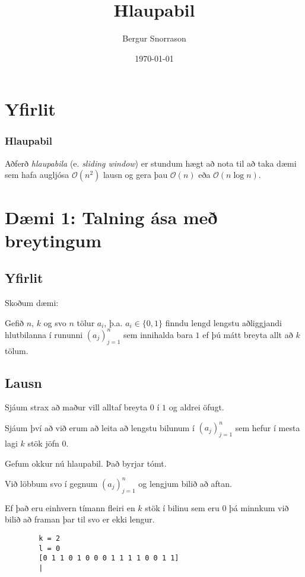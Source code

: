 \title{Hlaupabil}
\author{Bergur Snorrason}
\date{\today}



\frame{\titlepage}

\section{Yfirlit}
{
    \frametitle{Hlaupabil}
    {
        \item<1-> Aðferð \emph{hlaupabila} (e. \emph{sliding window}) er stundum hægt að nota til að taka
                    dæmi sem hafa augljósa $\mathcal{O}(n^2)$ lausn og gera þau $\mathcal{O}(n)$ eða $\mathcal{O}(n\log n)$.
    }
}

\section{Dæmi 1: Talning ása með breytingum}
\subsection{Yfirlit}
{
    {
        \item<1-> Skoðum dæmi:
        \item<2-> Gefið $n$, $k$ og svo $n$ tölur $a_i$, þ.a. $a_i \in \{0, 1\}$ finndu
                    lengd lengstu aðliggjandi hlutbilanna í rununni $(a_j)_{j = 1}^n$
                    sem innihalda bara $1$ ef þú mátt breyta allt að $k$ tölum.
    }
}

\subsection{Lausn}
{
    {
        \item<1-> Sjáum strax að maður vill alltaf breyta $0$ í $1$ og aldrei öfugt.
        \item<2-> Sjáum því að við erum að leita að lengstu bilunum í $(a_j)_{j = 1}^n$ sem hefur í mesta lagi $k$ stök jöfn $0$.
        \item<3-> Gefum okkur nú hlaupabil. Það byrjar tómt.
        \item<4-> Við löbbum svo í gegnum $(a_j)_{j = 1}^n$ og lengjum bilið að aftan.
        \item<5-> Ef það eru einhvern tímann fleiri en $k$ stök í bilinu sem eru $0$ þá minnkum við bilið að framan þar til svo er ekki lengur.
    }
}

{ \begin{verbatim}
        k = 2
        l = 0
        [0 1 1 0 1 0 0 0 1 1 1 1 0 0 1 1]
        |
\end{verbatim} }

